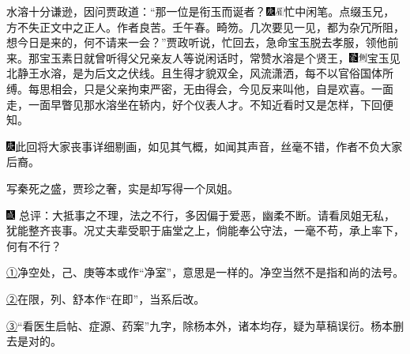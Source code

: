 水溶十分谦逊，因问贾政道：``那一位是衔玉而诞者？{\includegraphics[width=3mm]{../Images/00004}\includegraphics[width=3mm]{../Images/00010}\footnotesize \kaishu 忙中闲笔。点缀玉兄，方不失正文中之正人。作者良苦。壬午春。畸笏。}几次要见一见，都为杂冗所阻，想今日是来的，何不请来一会？''贾政听说，忙回去，急命宝玉脱去孝服，领他前来。那宝玉素日就曾听得父兄亲友人等说闲话时，常赞水溶是个贤王，{\includegraphics[width=3mm]{../Images/00006}\includegraphics[width=3mm]{../Images/00011}\footnotesize \kaishu 宝玉见北静王水溶，是为后文之伏线。}且生得才貌双全，风流潇洒，每不以官俗国体所缚。每思相会，只是父亲拘束严密，无由得会，今见反来叫他，自是欢喜。一面走，一面早瞥见那水溶坐在轿内，好个仪表人才。不知近看时又是怎样，下回便知。

{{\includegraphics[width=3mm]{../Images/00004}此回将大家丧事详细剔画，如见其气概，如闻其声音，丝毫不错，作者不负大家后裔。}}

{{写秦死之盛，贾珍之奢，实是却写得一个凤姐。}}

{\includegraphics[width=3mm]{../Images/00005} \kaishu 总评：大抵事之不理，法之不行，多因偏于爱恶，幽柔不断。请看凤姐无私，犹能整齐丧事。况丈夫辈受职于庙堂之上，倘能奉公守法，一毫不苟，承上率下，何有不行？}

{\href{../Text/part0018_split_000.html\#navto_1_a}{①}净空处，己、庚等本或作``净室''，意思是一样的。净空当然不是指和尚的法号。}

{\href{../Text/part0018_split_000.html\#navto_2_a}{②}在限，列、舒本作``在即''，当系后改。}

{\href{../Text/part0018_split_000.html\#navto_3_a}{③}``看医生启帖、症源、药案''九字，除杨本外，诸本均存，疑为草稿误衍。杨本删去是对的。}

